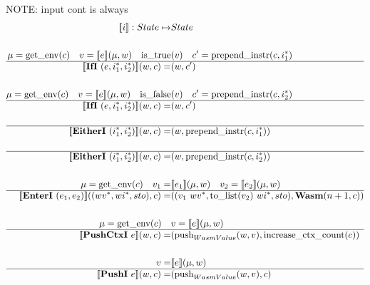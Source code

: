 
\newpage

NOTE: input cont is always \al
\begin{align*}
  \sem{i} : State \mapsto& State \\
%
\newline \\
  \mu = \text{get\_env}(c) \quad v = \sem{e}(\mu, w) \quad
  \text{is\_true}&(v) \quad c' = \text{prepend\_instr}(c, \seq{i_1}) \\
  \hline
  \sem{\ifi ~ (e, \seq{i_1}, \seq{i_2})}(w, c) =& (w, c') \\
%
\newline \\
  \mu = \text{get\_env}(c) \quad v = \sem{e}(\mu, w) \quad
  \text{is\_false}&(v) \quad c' = \text{prepend\_instr}(c, \seq{i_2}) \\
  \hline
  \sem{\ifi ~ (e, \seq{i_1}, \seq{i_2})}(w, c) =& (w, c') \\
%
\newline \\
  \hline
  \sem{\eitheri ~ (\seq{i_1}, \seq{i_2})}(w, c) =& (w, \text{prepend\_instr}(c, \seq{i_1})) \\
%
\newline \\
  \hline
  \sem{\eitheri ~ (\seq{i_1}, \seq{i_2})}(w, c) =& (w, \text{prepend\_instr}(c, \seq{i_2})) \\
%
\newline \\
  \mu = \text{get\_env}(c) \quad v_1 =& \sem{e_1}(\mu, w) \quad v_2 = \sem{e_2}(\mu, w) \\
  \hline
  \sem{\enteri ~ (e_1, e_2)}((\seq{wv}, \seq{wi}, sto), c)
  =&
  ((v_1 ~ \seq{wv}, \text{to\_list}(v_2) ~ \seq{wi}, sto), \wasm (n+1, c)) \\
%
\newline \\
  \mu = \text{get\_env}(c) \quad& v = \sem{e}(\mu, w) \\
  \hline
  \sem{\pushctxi ~ e}(w, c)
  =&
  (\text{push}_{WasmValue}(w, v), \text{increase\_ctx\_count}(c)) \\
%
\newline \\
  v =& \sem{e}(\mu, w) \\
  \hline
  \sem{\pushi ~ e}(w, c) =& (\text{push}_{WasmValue}(w, v), c) \\
%

\end{align*}
